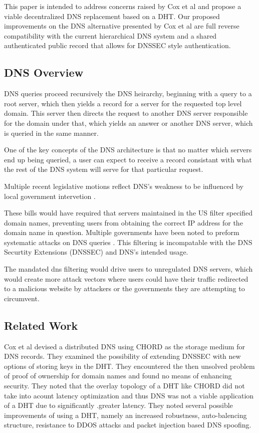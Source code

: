 \documentclass[11pt]{IEEEtran} %
\begin{document}
This paper is intended to address concerns raised by Cox et al\cite{cox} and propose a viable decentralized DNS replacement based on a DHT. Our proposed improvements on the DNS alternative presented by Cox et al are full reverse compatibility with the current hierarchical DNS system and a shared authenticated public record that allows for DNSSEC style authentication.


\subsection{DNS Overview}

DNS queries proceed recursively the DNS heirarchy, beginning with a query to a root server, which then yields a record for a server for the requested top level domain.  This server then directs the request to another DNS server responsible for the domain under that, which yields an answer or another DNS server, which is queried in the same manner.

One of the key concepts of the DNS architecture is that no matter which servers end up being queried, a user can expect to receive a record consistant with what the rest of the DNS system will serve for that particular request.


Multiple recent legislative motions reflect DNS's weakness to be influenced by local government intervetion \cite{sopa} \cite{lemley2011don} \cite{crocker2011security}.

These bills would have required that servers maintained in the US filter specified domain names, preventing users from obtaining the correct IP address for the domain name in question. Multiple governments have been noted to preform systematic attacks on DNS queries \cite{inject}. This filtering is incompatable with the DNS Securtity Extensions (DNSSEC) \cite{crocker2011security} and DNS's intended usage. 

The mandated dns filtering would drive users to unregulated DNS servers, which would create more attack vectors where users could have their traffic redirected to a malicious website by attackers or the governments they are attempting to circumvent.

\subsection{Related Work}

Cox et al devised a distributed DNS using CHORD\cite{chord} as the storage medium for DNS records. They examined the possibility of extending DNSSEC with new options of storing keys in the DHT. They encountered the then unsolved problem of proof of ownership for domain names and found no means of enhancing security. They noted that the overlay topology of a DHT like CHORD did not take into acount latency optimization and thus DNS was not a viable application of a DHT due to significantly .greater latency. They noted several possible improvements of using a DHT, namely an increased robustness, auto-balencing structure, resistance to DDOS attacks and packet injection based DNS spoofing.
\end{document}
